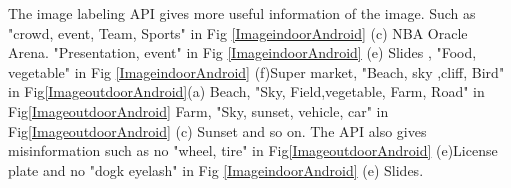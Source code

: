 \documentclass[11pt]{ucscthesis}
\begin{document}
 The image labeling API gives more useful information of the image. Such as "crowd, event, Team, Sports" in Fig \ref{ImageindoorAndroid} (c) NBA Oracle Arena. "Presentation, event" in Fig \ref{ImageindoorAndroid} (e) Slides , "Food, vegetable" in Fig \ref{ImageindoorAndroid} (f)Super market, "Beach, sky ,cliff, Bird" in Fig\ref{ImageoutdoorAndroid}(a) Beach, "Sky, Field,vegetable, Farm, Road" in Fig\ref{ImageoutdoorAndroid} Farm, "Sky, sunset, vehicle, car" in Fig\ref{ImageoutdoorAndroid} (c) Sunset and so on.
The API also gives misinformation such as no "wheel, tire" in Fig\ref{ImageoutdoorAndroid} (e)License plate and no "dogk eyelash" in Fig \ref{ImageindoorAndroid} (e) Slides. 

\begin{figure}
\centering
{}
  \hfill

\end{figure}
\end{document}
